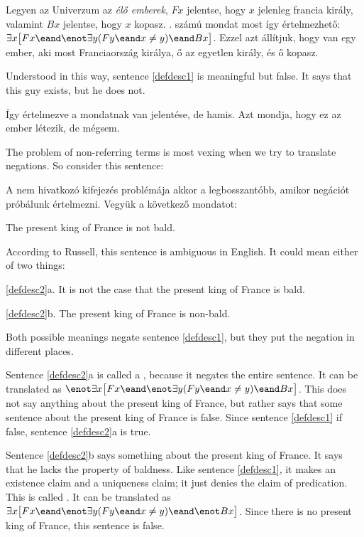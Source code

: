 Legyen az Univerzum az \emph{élő emberek}, $Fx$ jelentse, hogy $x$ jelenleg francia király, valamint $Bx$ jelentse, hogy $x$ kopasz. . számú mondat most így értelmezhető: $\exists x\bigl[Fx \eand \enot\exists y(Fy \eand x\neq y) \eand Bx\bigr]$. Ezzel azt állítjuk, hogy van egy ember, aki most Franciaország királya, ő az egyetlen király, és ő kopasz.

Understood in this way, sentence \ref{defdesc1} is meaningful but false. It says that this guy exists, but he does not.

Így értelmezve a mondatnak van jelentése, de hamis. Azt mondja, hogy ez az ember létezik, de mégsem.

The problem of non-referring terms is most vexing when we try to translate negations. So consider this sentence:

A nem hivatkozó kifejezés problémája akkor a legbosszantóbb, amikor negációt próbálunk értelmezni. Vegyük a következő mondatot:



\begin{earg}
\item[\ex{defdesc2}] The present king of France is not bald.
\end{earg}
According to Russell, this sentence is ambiguous in English. It could mean either of two things:
\begin{earg}
\item[\ref{defdesc2}a.] It is not the case that the present king of France is bald.
\item[\ref{defdesc2}b.] The present king of France is non-bald.
\end{earg}
Both possible meanings negate sentence \ref{defdesc1}, but they put the negation in different places.

Sentence \ref{defdesc2}a is called a , because it negates the entire sentence. It can be translated as $\enot\exists x\bigl[Fx \eand \enot\exists y(Fy \eand x\neq y) \eand Bx\bigr]$. This does not say anything about the present king of France, but rather says that some sentence about the present king of France is false. Since sentence \ref{defdesc1} if false, sentence \ref{defdesc2}a is true.

Sentence \ref{defdesc2}b says something about the present king of France. It says that he lacks the property of baldness. Like sentence \ref{defdesc1}, it makes an existence claim and a uniqueness claim; it just denies the claim of predication. This is called . It can be translated as $\exists x\bigl[Fx \eand \enot\exists y(Fy \eand x\neq y) \eand \enot Bx\bigr]$. Since there is no present king of France, this sentence is false.


